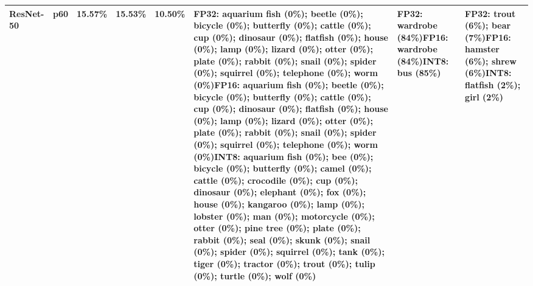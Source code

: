 \begin{longtable}{p{2.8cm} r r r r p{5.0cm} p{4.2cm} p{4.2cm}}
ResNet-50 & p60 & 15.57\% & 15.53\% & 10.50\% & FP32: aquarium fish (0\%); beetle (0\%); bicycle (0\%); butterfly (0\%); cattle (0\%); cup (0\%); dinosaur (0\%); flatfish (0\%); house (0\%); lamp (0\%); lizard (0\%); otter (0\%); plate (0\%); rabbit (0\%); snail (0\%); spider (0\%); squirrel (0\%); telephone (0\%); worm (0\%)\newline FP16: aquarium fish (0\%); beetle (0\%); bicycle (0\%); butterfly (0\%); cattle (0\%); cup (0\%); dinosaur (0\%); flatfish (0\%); house (0\%); lamp (0\%); lizard (0\%); otter (0\%); plate (0\%); rabbit (0\%); snail (0\%); spider (0\%); squirrel (0\%); telephone (0\%); worm (0\%)\newline INT8: aquarium fish (0\%); bee (0\%); bicycle (0\%); butterfly (0\%); camel (0\%); cattle (0\%); crocodile (0\%); cup (0\%); dinosaur (0\%); elephant (0\%); fox (0\%); house (0\%); kangaroo (0\%); lamp (0\%); lobster (0\%); man (0\%); motorcycle (0\%); otter (0\%); pine tree (0\%); plate (0\%); rabbit (0\%); seal (0\%); skunk (0\%); snail (0\%); spider (0\%); squirrel (0\%); tank (0\%); tiger (0\%); tractor (0\%); trout (0\%); tulip (0\%); turtle (0\%); wolf (0\%) & FP32: wardrobe (84\%)\newline FP16: wardrobe (84\%)\newline INT8: bus (85\%) & FP32: trout (6\%); bear (7\%)\newline FP16: hamster (6\%); shrew (6\%)\newline INT8: flatfish (2\%); girl (2\%) \\ \hline

\end{longtable}
